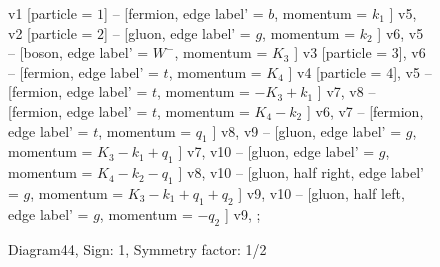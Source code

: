 \documentclass{revtex4}
\begin{document}
\begin{figure}[!htb]
\begin{center}
{    %
v1 [particle = \(1\)] -- [fermion, edge label' = \(b\), momentum = \(k_{1}\) ] v5, 
v2 [particle = \(2\)] -- [gluon, edge label' = \(g\), momentum = \(k_{2}\) ] v6, 
v5 -- [boson, edge label' = \(W^{-}\), momentum = \(K_{3}\) ] v3 [particle = \(3\)], 
v6 -- [fermion, edge label' = \(t\), momentum = \(K_{4}\) ] v4 [particle = \(4\)], 
v5 -- [fermion, edge label' = \(t\), momentum = \(-K_{3} + k_{1}\) ] v7, 
v8 -- [fermion, edge label' = \(t\), momentum = \(K_{4} - k_{2}\) ] v6, 
v7 -- [fermion, edge label' = \(t\), momentum = \(q_{1}\) ] v8, 
v9 -- [gluon, edge label' = \(g\), momentum = \(K_{3} - k_{1} + q_{1}\) ] v7, 
v10 -- [gluon, edge label' = \(g\), momentum = \(K_{4} - k_{2} - q_{1}\) ] v8, 
v10 -- [gluon, half right, edge label' = \(g\), momentum = \(K_{3} - k_{1} + q_{1} + q_{2}\) ] v9, 
v10 -- [gluon, half left, edge label' = \(g\), momentum = \(-q_{2}\) ] v9, 
};
\end{center}
\caption{Diagram44, Sign: 1, Symmetry factor: 1/2}
\end{figure}
\newpage
\end{document}
